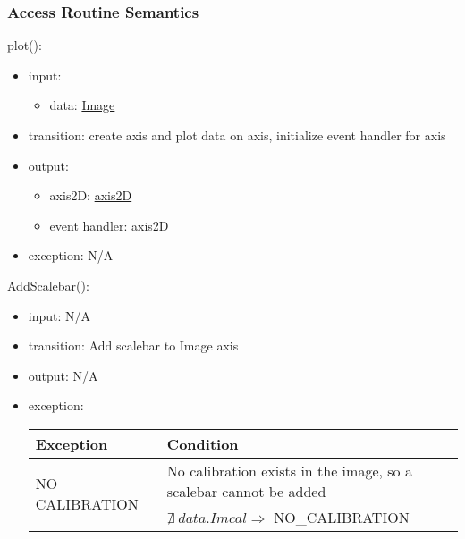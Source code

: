 \documentclass[12pt, titlepage]{article}
\begin{document}
\subsubsection{Access Routine Semantics}

\noindent plot():
\begin{itemize}
    \item input:
    \begin{itemize}
        \item data: \hyperref[Mod:Image]{Image}
    \end{itemize}
    \item transition: create axis and plot data on axis, initialize event
    handler for axis
    \item output:
    \begin{itemize}
        \item axis2D: \hyperref[Mod:Plotting]{axis2D}
        \item event handler: \hyperref[Mod:Plotting]{axis2D}
    \end{itemize}
    \item exception: N/A
\end{itemize}

\noindent AddScalebar():
\begin{itemize}
    \item input: N/A
    \item transition: Add scalebar to Image axis
    \item output: N/A
    \item exception: 
    \begin{center}
        \begin{tabular}{p{3.5cm} p{12cm}}
            \toprule[0.15em]
            \textbf{Exception} & \textbf{Condition}\\
            \midrule[0.1em]
            \multirow{2}{0.25\textwidth}{NO CALIBRATION} & No calibration exists
            in the image, so a scalebar cannot be added\\ 
            & $\nexists\ data.Imcal \Rightarrow$ NO\_CALIBRATION\\ 
            \bottomrule[0.15em]
        \end{tabular}
    \end{center}
\end{itemize}
\end{document}
